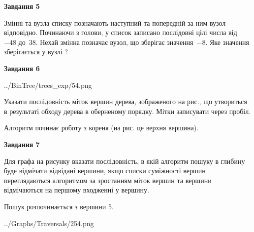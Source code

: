 \documentclass[12pt, ukrainian]{article}
\begin{document}
{\begin {large}
{\begin {center}\textbf{Завдання 5}\end {center}}\par
Змінні  та  вузла списку позначають наступний та попередній за ним вузол відповідно. Починаючи з голови, у список записано послідовні цілі числа від~$-48$ до~$38$. Нехай змінна  позначає вузол, що зберігає значення~$-8$.
Яке значення зберігається у вузлі  ?\par
\newpage

{\begin {center}\textbf{Завдання 6}\end {center}}\par

\begin{center}
	{../BinTree/trees_exp/54.png}
\end{center}
Указати послідовність міток вершин дерева, зображеного на рис., що утвориться в результаті обходу дерева в оберненому порядку. Мітки записувати через пробіл.\par Алгоритм починає роботу з кореня (на рис. це верхня вершина).\par
\newpage

{\begin {center}\textbf{Завдання 7}\end {center}}\par
Для графа на рисунку вказати послідовність, в якій алгоритм пошуку в глибину буде відмічати відвідані вершини, якщо списки суміжності вершин переглядаються алгоритмом за зростанням міток вершин та вершини відмічаються на першому вход\-женні у вершину.\par
Пошук розпочинається з вершини 5.\par

\begin{center}
	{../Graphs/Traversals/254.png}
\end{center}\par
\newpage


\end{large}}
\end{document}
